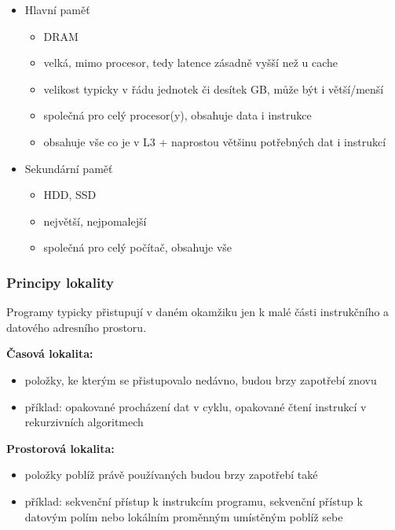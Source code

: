\begin{itemize}
	\item Hlavní paměť
	\begin{itemize}
		\item DRAM
		\item velká, mimo procesor, tedy latence zásadně vyšší než u cache
		\item velikost typicky v řádu jednotek či desítek GB, může být i větší/menší
		\item společná pro celý procesor(y), obsahuje data i instrukce
		\item obsahuje vše co je v L3 + naprostou většinu potřebných dat i instrukcí
	\end{itemize}
	
	\item Sekundární paměť
	\begin{itemize}
		\item HDD, SSD
		\item největší, nejpomalejší
		\item společná pro celý počítač, obsahuje vše
	\end{itemize}
	 
\end{itemize}

\subsubsection*{Principy lokality}
Programy typicky přistupují v daném okamžiku jen k malé části instrukčního a datového adresního prostoru.

\textbf{Časová lokalita:}
\begin{itemize}
	\item položky, ke kterým se přistupovalo nedávno, budou brzy zapotřebí znovu
	\item příklad: opakované procházení dat v cyklu, opakované čtení instrukcí v rekurzivních algoritmech
\end{itemize}

\textbf{Prostorová lokalita:}
\begin{itemize}
	\item položky poblíž právě používaných budou brzy zapotřebí také
	\item příklad: sekvenční přístup k instrukcím programu, sekvenční přístup k datovým polím nebo lokálním proměnným umístěným poblíž sebe
\end{itemize}

